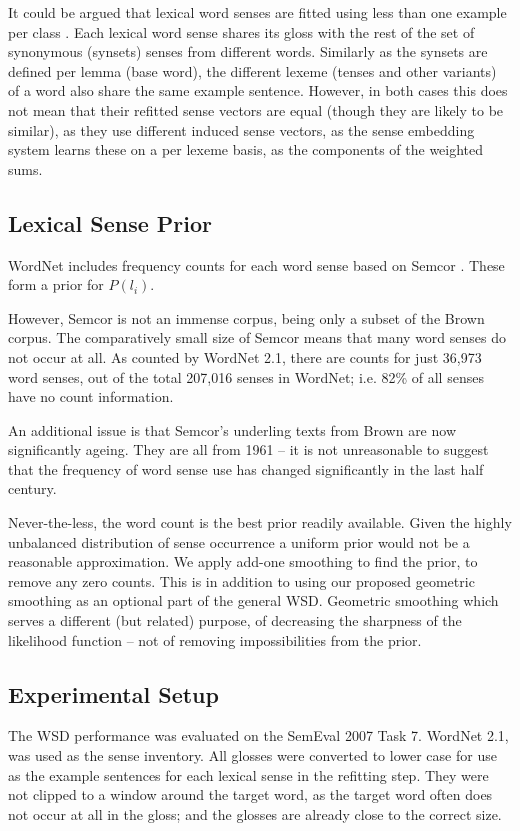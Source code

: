 \documentclass{sig-alternate}
\begin{document}
It could be argued that lexical word senses are fitted using less than one example per class . Each lexical word sense shares its gloss with the rest of the set of synonymous (synsets) senses from different words. Similarly as the synsets are defined per lemma (base word), the different lexeme (tenses and other variants) of a word also share the same example sentence. However, in both cases this does not mean that their refitted sense vectors are equal (though they are likely to be similar), as they use different induced sense vectors, as the sense embedding system learns these on a per lexeme basis, as the components of the weighted sums. 

\subsection{Lexical Sense Prior}
WordNet includes frequency counts for each word sense based on Semcor \textcite{tengi1998design}. These form a prior for $P(l_i)$.

However, Semcor is not an immense corpus, being only a subset of the Brown corpus. The comparatively small size of Semcor means that many word senses do not occur at all. As counted by WordNet 2.1, there are counts for just  36,973 word senses, out of the total 207,016 senses in WordNet; i.e. 82\% of all senses have no count information.

An additional issue is that Semcor's underling texts from Brown are now significantly ageing. They are all from 1961 \cite{francis1979brown} -- it is not unreasonable to suggest that the frequency of word sense use has changed significantly in the last half century.

Never-the-less, the word count is the best prior readily available. Given the highly unbalanced distribution of sense occurrence a uniform prior would not be a reasonable approximation.
We apply add-one smoothing to find the prior, to remove any zero counts.
This is in addition to using our proposed geometric smoothing as an optional part of the general WSD.
Geometric smoothing which serves a different (but related) purpose, of decreasing the sharpness of the likelihood function -- not of removing impossibilities from the prior.

\subsection {Experimental Setup}
The WSD performance was evaluated on the SemEval 2007 Task 7. 
WordNet 2.1, was used as the sense inventory.
All glosses were converted to lower case for use as the example sentences for each lexical sense in the refitting step. They were not clipped to a window around the target word, as the target word often does not occur at all in the gloss; and the glosses are already close to the correct size.
\end{document}
